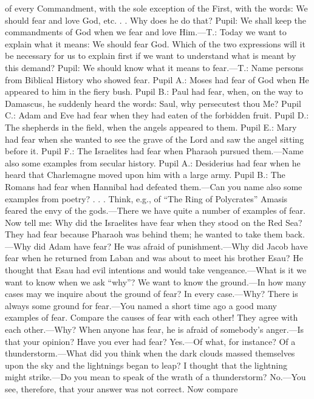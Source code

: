 of every Commandment, with the sole exception of the First, with the words: We should fear and love God, etc. . . Why does he do that? Pupil: We shall keep the commandments of God when we fear and love Him.—T.: Today we want to explain what it means: We should fear God. Which of the two expressions will it be necessary for us to explain first if we want to understand what is meant by this demand? Pupil: We should know what it means to fear.—T.: Name persons from Biblical History who showed fear. Pupil A.: Moses had fear of God when He appeared to him in the fiery bush. Pupil B.: Paul had fear, when, on the way to Damascus, he suddenly heard the words: Saul, why persecutest thou Me? Pupil C.: Adam and Eve had fear when they had eaten of the forbidden fruit. Pupil D.: The shepherds in the field, when the angels appeared to them. Pupil E.: Mary had fear when she wanted to see the grave of the Lord and saw the angel sitting before it. Pupil F.: The Israelites had fear when Pharaoh pursued them.—Name also some examples from secular history. Pupil A.: Desiderius had fear when he heard that Charlemagne moved upon him with a large army. Pupil B.: The Romans had fear when Hannibal had defeated them.—Can you name also some examples from poetry? . . . Think, e.g., of “The Ring of Polycrates” Amasis feared the envy of the gods.—There we have quite a number of examples of fear. Now tell me: Why did the Israelites have fear when they stood on the Red Sea? They had fear because Pharaoh was behind them; he wanted to take them back.—Why did Adam have fear? He was afraid of punishment.—Why did Jacob have fear when he returned from Laban and was about to meet his brother Esau? He thought that Esau had evil intentions and would take vengeance.—What is it we want to know when we ask “why”? We want to know the ground.—In how many cases may we inquire about the ground of fear? In every case.—Why? There is always some ground for fear.—You named a short time ago a good many examples of fear. Compare the causes of fear with each other! They agree with each other.—Why? When anyone has fear, he is afraid of somebody’s anger.—Is that your opinion? Have you ever had fear? Yes.—Of what, for instance? Of a thunderstorm.—What did you think when the dark clouds massed themselves upon the sky and the lightnings began to leap? I thought that the lightning might strike.—Do you mean to speak of the wrath of a thunderstorm? No.—You see, therefore, that your answer was not correct. Now compare

